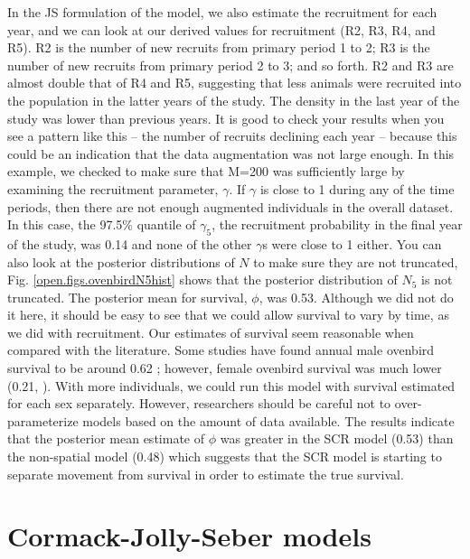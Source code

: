 In the JS formulation of the model, we also estimate the recruitment for each year,
and we can look at our derived values for recruitment (R2, R3, R4, and R5).
R2 is the number of new
recruits from primary period 1 to 2; R3 is the number of new recruits from primary period 2 to 3; and so forth.
R2 and R3 are almost
double that of R4 and R5, suggesting that less animals were recruited into the population in the latter years
of the study.  The density in
the last year of the study was lower than previous years.
It is good to check your results when you see a pattern like this -- the number
of recruits declining each year -- because this could be an indication that the data augmentation was not large enough.
In this example,
we checked to make sure that M=200 was sufficiently large by examining the recruitment parameter,
$\gamma$.  If $\gamma$ is close to 1 during any of the time periods, then there are not enough
augmented individuals in the overall dataset.  In this case, the 97.5\% quantile of $\gamma_5$,
the recruitment probability in the final year of the study, was 0.14 and none of the other $\gamma$s
 were close to 1 either.  You can also look at the posterior distributions of $N$ to make sure
they are not truncated, Fig. \ref{open.figs.ovenbirdN5hist} shows that the posterior distribution of $N_5$ is not
truncated. The posterior mean for survival, $\phi$, was 0.53.  Although we did not do it here,
it should be easy to see that we could allow survival to vary by time, as we did with recruitment.
Our estimates of survival seem
reasonable when compared with the literature.  Some studies have found annual male ovenbird
survival to be around 0.62 \citep{porneluzi_faaborg:1999, bayne_hobson:2002}; however,
female ovenbird
survival was much lower (0.21,
\cite{bayne_hobson:2002}). With more individuals, we could run this model with survival
estimated for each sex separately.
However, researchers should be careful not to over-parameterize models based on the amount of
data available.   The results indicate that the posterior mean estimate of $\phi$ was greater in the SCR
model (0.53) than the non-spatial model (0.48) which suggests that the SCR model is starting to separate
movement from survival in order to estimate the true survival.



\section{Cormack-Jolly-Seber models}

